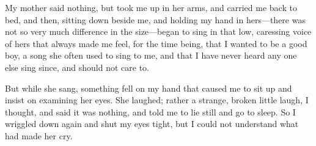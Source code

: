 \documentclass[a4paper, 12pt]{memoir}
\begin{document}
My mother said nothing, but took me up in her arms, and carried me back to bed, and then, sitting down beside me, and holding my hand in hers---there was not so very much difference in the size---began to sing in that low, caressing voice of hers that always made me feel, for the time being, that I wanted to be a good boy, a song she often used to sing to me, and that I have never heard any one else sing since, and should not care to.

But while she sang, something fell on my hand that caused me to sit up and insist on examining her eyes.  She laughed; rather a strange, broken little laugh, I thought, and said it was nothing, and told me to lie still and go to sleep.  So I wriggled down again and shut my eyes tight, but I could not understand what had made her cry.
\backmatter
\end{document}
